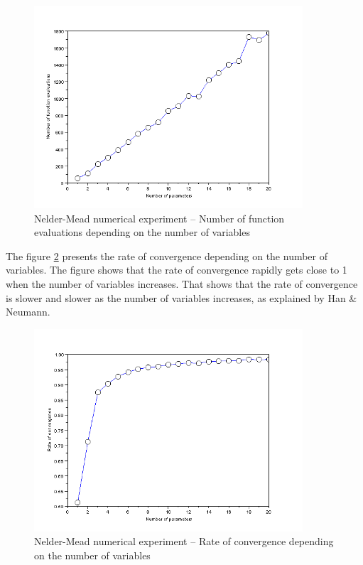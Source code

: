 \begin{figure}
\begin{center}
\includegraphics[width=10cm]{neldermeadmethod/neldermead-dimension-nfevals.png}
\end{center}
\caption{Nelder-Mead numerical experiment -- Number of function evaluations 
depending on the number of variables}
\label{fig-nm-numexp3-fvn}
\end{figure}

The figure \ref{fig-nm-numexp3-rho} presents the rate of convergence 
depending on the number of variables. The figure shows that 
the rate of convergence rapidly gets close to 1 when the number 
of variables increases. That shows that the rate of convergence 
is slower and slower as the number of variables increases, as 
explained by Han \& Neumann.

\begin{figure}
\begin{center}
\includegraphics[width=10cm]{neldermeadmethod/neldermead-dimension-rho.png}
\end{center}
\caption{Nelder-Mead numerical experiment -- Rate of convergence 
depending on the number of variables}
\label{fig-nm-numexp3-rho}
\end{figure}

